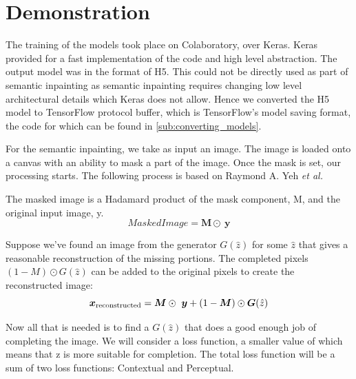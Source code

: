 
\section{Demonstration} %
\label{sec:demonstration}
The training of the models took place on Colaboratory, over Keras. Keras provided for a fast implementation of the code and high level abstraction. The output model was in the format of H5. This could not be directly used as part of semantic inpainting as semantic inpainting requires changing low level architectural details which Keras does not allow. Hence we converted the H5 model to TensorFlow protocol buffer, which is TensorFlow's model saving format, the code for which can be found in \ref{sub:converting_models}.
\par\bigskip

For the semantic inpainting, we take as input an image. The image is loaded onto a canvas with an ability to mask a part of the image. Once the mask is set, our processing starts. The following process is based on Raymond A. Yeh \textit{et al.} \cite{inpainting}
\par\bigskip

The masked image is a Hadamard product of the mask component, M, and the original input image, y. 
\begin{equation} \label{eqn:masked_image}
Masked Image = \bm{M} \odot\  \bm{y}
\end{equation}
\par\bigskip

Suppose we've found an image from the generator $G(\hat z)$ for some $\hat z$ that gives a reasonable reconstruction of the missing portions. The completed pixels $(1 - M) \odot G(\hat z)$ can be added to the original pixels to create the reconstructed image:
\begin{equation} \label{eqn:reconstructed_image}
\bm{x} \textsubscript{reconstructed} = \bm{M} \odot\  \bm{y} + (1 - \bm{M}) \odot \bm{G} (\hat z)
\end{equation}
\par\bigskip

Now all that is needed is to find a $G(\hat z)$ that does a good enough job of completing the image. We will consider a loss function, a smaller value of which means that z is more suitable for completion. The total loss function will be a sum of two loss functions: Contextual and Perceptual.

